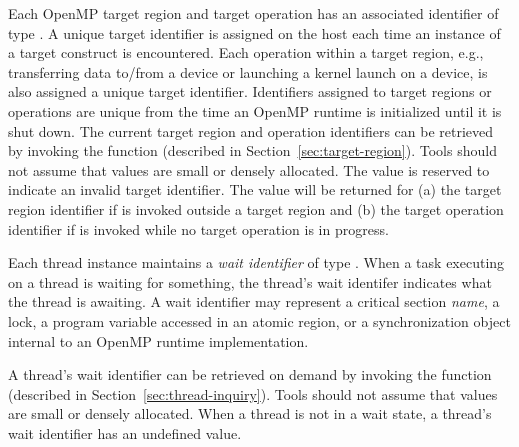 Each OpenMP target region and target operation has an associated identifier of type .
A unique target identifier is assigned on the host each time an instance of a target construct is encountered.
Each operation within a target region, e.g., transferring data to/from a device or launching a kernel launch
on a device, is also assigned a unique target identifier.
Identifiers assigned to target regions or operations
are unique from the time an OpenMP runtime is initialized until it is shut down.
The current target region and operation identifiers can be retrieved by invoking the  function (described in Section~\ref{sec:target-region}).
Tools should not assume that  values are small or densely allocated.
The value  is reserved to indicate an invalid target identifier.
The value  will be returned for (a) the target region identifier if  is invoked outside a target region and (b) the target operation identifier if  is invoked while no target operation is in progress.


Each thread instance maintains a {\em wait identifier} of type .
When a task executing on a thread is waiting for something, the thread's wait identifer indicates what the thread is awaiting.
A wait identifier may represent a critical section {\em name}, a lock,  a program variable accessed in an atomic region, or a synchronization object internal to an OpenMP runtime implementation.
\begin{comment}
\begin{boxedcode}
typedef uint64\_t ompt\_wait\_id\_t;
\end{boxedcode}
\end{comment}
A thread's wait identifier can be retrieved on demand by invoking the  function (described in Section~\ref{sec:thread-inquiry}).
Tools should not assume that  values are small or densely allocated.
When a thread is not in a wait state, a thread's wait identifier has an undefined value.

